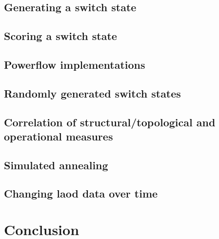 \documentclass[a4paper]{report}
\begin{document}


\section{Generating a switch state}



\section{Scoring a switch state}\label{sec:score}



\section{Powerflow implementations}\label{sec:pf:impl}



\section{Randomly generated switch states}



\section{Correlation of structural/topological and operational measures}



\section{Simulated annealing}




\section{Changing laod data over time}



\chapter{Conclusion}
\end{document}
